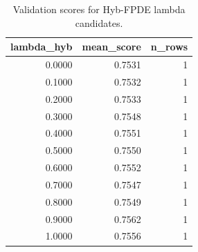 \begin{table}[t]
\caption{Validation scores for Hyb-FPDE lambda candidates.}
\label{tab:lambda_distribution_computed}
\centering
\begin{tabular}{rrr}
\toprule
lambda\_hyb & mean\_score & n\_rows \\
\midrule
0.0000 & 0.7531 & 1 \\
0.1000 & 0.7532 & 1 \\
0.2000 & 0.7533 & 1 \\
0.3000 & 0.7548 & 1 \\
0.4000 & 0.7551 & 1 \\
0.5000 & 0.7550 & 1 \\
0.6000 & 0.7552 & 1 \\
0.7000 & 0.7547 & 1 \\
0.8000 & 0.7549 & 1 \\
0.9000 & 0.7562 & 1 \\
1.0000 & 0.7556 & 1 \\
\bottomrule
\end{tabular}

\end{table}
